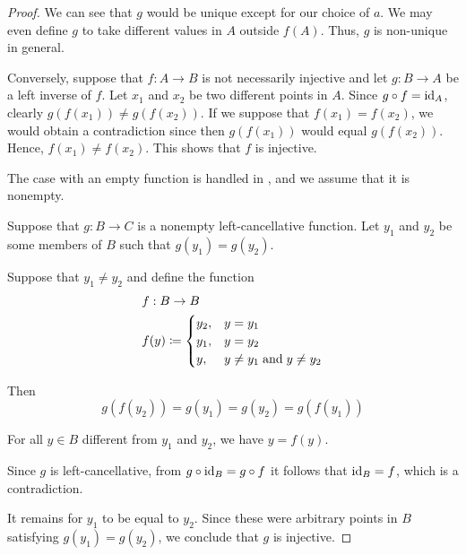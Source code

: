 \begin{proof}
  We can see that \( g \) would be unique except for our choice of \( a \). We may even define \( g \) to take different values in \( A \) outside \( f(A) \). Thus, \( g \) is non-unique in general.

  Conversely, suppose that \( f: A \to B \) is not necessarily injective and let \( g: B \to A \) be a left inverse of \( f \). Let \( x_1 \) and \( x_2 \) be two different points in \( A \). Since \( g \bincirc f = \id_A \), clearly \( g(f(x_1)) \neq g(f(x_2)) \). If we suppose that \( f(x_1) = f(x_2) \), we would obtain a contradiction since then \( g(f(x_1)) \) would equal \( g(f(x_2)) \). Hence, \( f(x_1) \neq f(x_2) \). This shows that \( f \) is injective.

   The case with an empty function is handled in , and we assume that it is nonempty.

  Suppose that \( g: B \to C \) is a nonempty left-cancellative function. Let \( y_1 \) and \( y_2 \) be some members of \( B \) such that \( g(y_1) = g(y_2) \).

  Suppose that \( y_1 \neq y_2 \) and define the function
  \begin{equation*}
    \begin{aligned}
      &f: B \to B \\
      &f(y) \coloneqq \begin{cases}
        y_2, &y = y_1 \\
        y_1, &y = y_2 \\
        y,   &y \neq y_1 \T{and} y \neq y_2
      \end{cases}
    \end{aligned}
  \end{equation*}

  Then
  \begin{equation*}
    g(f(y_2)) = g(y_1) = g(y_2) = g(f(y_1))
  \end{equation*}

  For all \( y \in B \) different from \( y_1 \) and \( y_2 \), we have \( y = f(y) \).

  Since \( g \) is left-cancellative, from \( g \bincirc \id_B = g \bincirc f \) it follows that \( \operatorname{id}_B = f \), which is a contradiction.

  It remains for \( y_1 \) to be equal to \( y_2 \). Since these were arbitrary points in \( B \) satisfying \( g(y_1) = g(y_2) \), we conclude that \( g \) is injective.


\end{proof}
